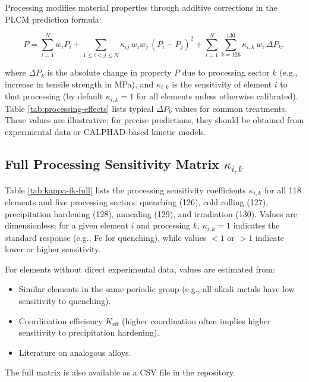 \documentclass[12pt,a4paper]{article}
\newcommand{\Keff}{K_{\mathrm{eff}}}
\begin{document}
	Processing modifies material properties through additive corrections in the PLCM prediction formula:
	
	\[
	P = \sum_{i=1}^{N} w_i P_i
	+ \sum_{1\le i<j\le N} \kappa_{ij}\, w_i w_j\, (P_i - P_j)^2
	+ \sum_{i=1}^{N} \sum_{k=126}^{130} \kappa_{i,k}\, w_i\, \Delta P_k,
	\]
	
	where \(\Delta P_k\) is the absolute change in property \(P\) due to processing sector \(k\) (e.g., increase in tensile strength in MPa), and \(\kappa_{i,k}\) is the sensitivity of element \(i\) to that processing (by default \(\kappa_{i,k}=1\) for all elements unless otherwise calibrated). Table \ref{tab:processing-effects} lists typical \(\Delta P_k\) values for common treatments. These values are illustrative; for precise predictions, they should be obtained from experimental data or CALPHAD‑based kinetic models.
	
	\subsection{Full Processing Sensitivity Matrix \(\kappa_{i,k}\)}
	\label{subsec:full-kappa-ik}
	
	Table \ref{tab:kappa-ik-full} lists the processing sensitivity coefficients \(\kappa_{i,k}\) for all 118 elements and five processing sectors: quenching (126), cold rolling (127), precipitation hardening (128), annealing (129), and irradiation (130). Values are dimensionless; for a given element \(i\) and processing \(k\), \(\kappa_{i,k}=1\) indicates the standard response (e.g., Fe for quenching), while values \(<1\) or \(>1\) indicate lower or higher sensitivity.
	
	For elements without direct experimental data, values are estimated from:
	\begin{itemize}
		\item Similar elements in the same periodic group (e.g., all alkali metals have low sensitivity to quenching).
		\item Coordination efficiency \(\Keff\) (higher coordination often implies higher sensitivity to precipitation hardening).
		\item Literature on analogous alloys.
	\end{itemize}
	
	The full matrix is also available as a CSV file in the repository.
	
\end{document}
